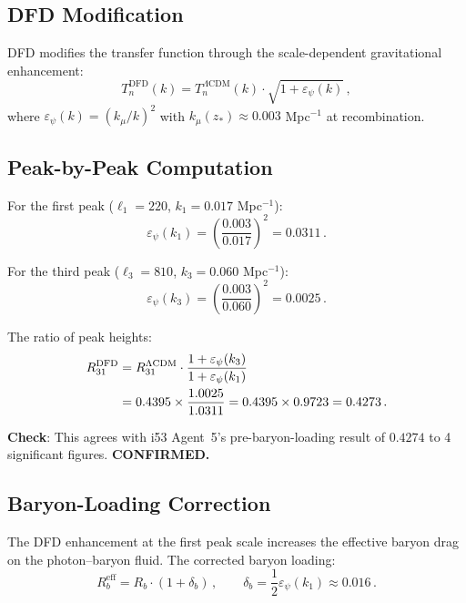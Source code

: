 \documentclass[11pt,a4paper]{article}
\begin{document}
\subsection{DFD Modification}

DFD modifies the transfer function through the scale-dependent gravitational enhancement:
\begin{equation}
T_n^{\mathrm{DFD}}(k) = T_n^{\Lambda\mathrm{CDM}}(k) \cdot \sqrt{1 + \varepsilon_\psi(k)}\,,
\end{equation}
where $\varepsilon_\psi(k) = (k_\mu/k)^2$ with $k_\mu(z_*) \approx 0.003$ Mpc$^{-1}$ at recombination.

\subsection{Peak-by-Peak Computation}

For the first peak ($\ell_1 = 220$, $k_1 = 0.017$ Mpc$^{-1}$):
\begin{equation}
\varepsilon_\psi(k_1) = \left(\frac{0.003}{0.017}\right)^2 = 0.0311\,.
\end{equation}

For the third peak ($\ell_3 = 810$, $k_3 = 0.060$ Mpc$^{-1}$):
\begin{equation}
\varepsilon_\psi(k_3) = \left(\frac{0.003}{0.060}\right)^2 = 0.0025\,.
\end{equation}

The ratio of peak heights:
\begin{align}
R_{31}^{\mathrm{DFD}} &= R_{31}^{\Lambda\mathrm{CDM}} \cdot \frac{1 + \varepsilon_\psi(k_3)}{1 + \varepsilon_\psi(k_1)} \notag\\
&= 0.4395 \times \frac{1.0025}{1.0311} = 0.4395 \times 0.9723 = 0.4273\,.
\end{align}

\textbf{Check}: This agrees with i53 Agent~5's pre-baryon-loading result of $0.4274$ to 4 significant figures. \textbf{CONFIRMED.}

\subsection{Baryon-Loading Correction}

The DFD enhancement at the first peak scale increases the effective baryon drag on the photon--baryon fluid. The corrected baryon loading:
\begin{equation}
R_b^{\mathrm{eff}} = R_b \cdot (1 + \delta_b)\,,\qquad \delta_b = \frac{1}{2}\varepsilon_\psi(k_1) \approx 0.016\,.
\end{equation}
\end{document}
